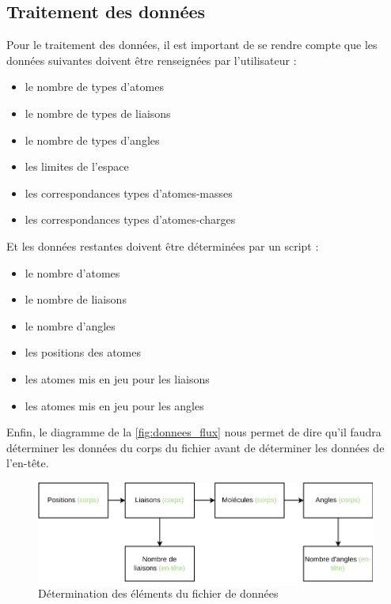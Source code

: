 \documentclass[11pt, a4paper]{article}
\begin{document}
	\subsection{Traitement des données}

Pour le traitement des données, il est important de se rendre compte que les données suivantes doivent être renseignées par l'utilisateur :
\begin{itemize}
	\item le nombre de types d'atomes
	\item le nombre de types de liaisons
	\item le nombre de types d'angles
	\item les limites de l'espace
	\item les correspondances types d'atomes-masses
	\item les correspondances types d'atomes-charges
\end{itemize}

Et les données restantes doivent être déterminées par un script :
\begin{itemize}
	\item le nombre d'atomes
	\item le nombre de liaisons
	\item le nombre d'angles
	\item les positions des atomes
	\item les atomes mis en jeu pour les liaisons
	\item les atomes mis en jeu pour les angles
\end{itemize}

Enfin, le diagramme de la \autoref{fig:donnees_flux} nous permet de dire qu'il faudra déterminer les données du corps du fichier avant de déterminer les données de l'en-tête.

\begin{figure}[hpbt]
	\centering
	\includegraphics[scale=1]{donnees-flux.pdf}
	\caption{Détermination des éléments du fichier de données}
	\label{fig:donnees_flux}
\end{figure}
\end{document}
